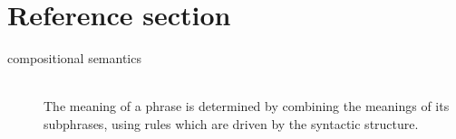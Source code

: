 \documentclass{article}
\begin{document}
\pagebreak
\section*{Reference section} \label{sec:reference}
\begin{description}
	\item[compositional semantics] \hfill \\ The meaning of a phrase is determined by combining the meanings of its subphrases, using rules which are driven by the syntactic structure.
\end{description}
\end{document}
